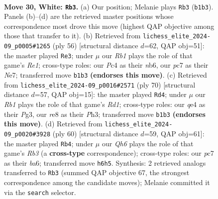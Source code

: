\documentclass[11pt]{article}
\begin{document}
\clearpage

\begin{figure}[p]\centering
\begin{subfigure}{0.46\textwidth}\centering
\resizebox{\linewidth}{!}{%
\newchessgame
\chessboard[
  setfen={4r2k/p1pp3n/5p1Q/8/1PPPq3/8/2P2P1P/1R4K1 w - - 1 30},
  showmover=false,
  pgfstyle=straightmove, color=movearrow, markmove={b1-b3}
]}
\caption{}
\end{subfigure}\hfill
\begin{subfigure}{0.46\textwidth}\centering
\resizebox{\linewidth}{!}{%
\newchessgame
\chessboard[
  setfen={r6k/pp2N2b/1np4Q/8/8/7P/Pq3PP1/4R1K1 w - - 0 29},
  showmover=false,
  pgfstyle=straightmove, color=movearrow, markmove={e1-e3}
]}
\caption{}
\end{subfigure}
\\[4pt]
\begin{subfigure}{0.46\textwidth}\centering
\resizebox{\linewidth}{!}{%
\newchessgame
\chessboard[
  setfen={4r1k1/2pQ1p2/7p/p3q3/8/Pp4PP/6P1/3R3K w - - 2 36},
  showmover=false,
  pgfstyle=straightmove, color=movearrow, markmove={d1-d4}
]}
\caption{}
\end{subfigure}\hfill
\begin{subfigure}{0.46\textwidth}\centering
\resizebox{\linewidth}{!}{%
\newchessgame
\chessboard[
  setfen={2r3k1/5p2/b5pp/3p4/3q4/PRn4P/2Q2PP1/4R2K w - - 0 31},
  showmover=false,
  pgfstyle=straightmove, color=movearrow, markmove={b3-b4}
]}
\caption{}
\end{subfigure}
\caption{\textbf{Move 30, White: \texttt{Rb3}.} (a) Our position; Melanie plays \texttt{Rb3} (\texttt{b1b3}). Panels (b)--(d) are the retrieved master positions whose correspondence most drove this move (highest QAP objective among those that transfer to it). (b) Retrieved from \texttt{lichess\_elite\_2024-09\_p0005\#1265} (ply 56) [structural distance $d$=62, QAP obj=51]: the master played \texttt{Re3}; under $\mu$ our \emph{Rb1} plays the role of that game's \emph{Re1}; cross-type roles: our \emph{P}c4 as their \emph{n}b6, our \emph{p}c7 as their \emph{N}e7; transferred move \texttt{b1b3} \textbf{(endorses this move)}. (c) Retrieved from \texttt{lichess\_elite\_2024-09\_p0016\#2571} (ply 70) [structural distance $d$=57, QAP obj=15]: the master played \texttt{Rd4}; under $\mu$ our \emph{Rb1} plays the role of that game's \emph{Rd1}; cross-type roles: our \emph{q}e4 as their \emph{P}g3, our \emph{r}e8 as their \emph{P}h3; transferred move \texttt{b1b3} \textbf{(endorses this move)}. (d) Retrieved from \texttt{lichess\_elite\_2024-09\_p0020\#3928} (ply 60) [structural distance $d$=59, QAP obj=61]: the master played \texttt{Rb4}; under $\mu$ our \emph{Qh6} plays the role of that game's \emph{Rb3} (a \textbf{cross-type} correspondence); cross-type roles: our \emph{p}c7 as their \emph{b}a6; transferred move \texttt{h6h5}. Synthesis: 2 retrieved analogs transferred to \texttt{Rb3} (summed QAP objective 67, the strongest correspondence among the candidate moves); Melanie committed it via the \texttt{search} selector.}
\label{fig:thought-m58}
\end{figure}
\end{document}
